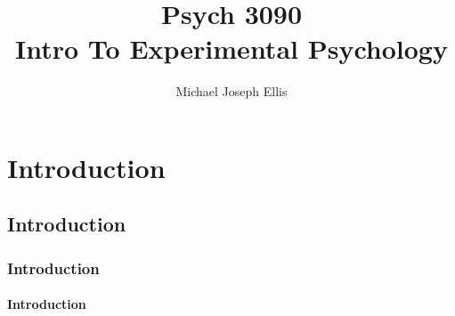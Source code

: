 \documentclass[11pt]{report}
\title{\Huge{Psych 3090}\\Intro To Experimental Psychology}
\author{\huge{Michael Joseph Ellis}}
\date{}
\begin{document}
\maketitle
\newpage
\tableofcontents
\pagebreak

\chapter{Introduction}

\section{Introduction}

\subsection{Introduction}

\subsubsection{Introduction}
\end{document}
